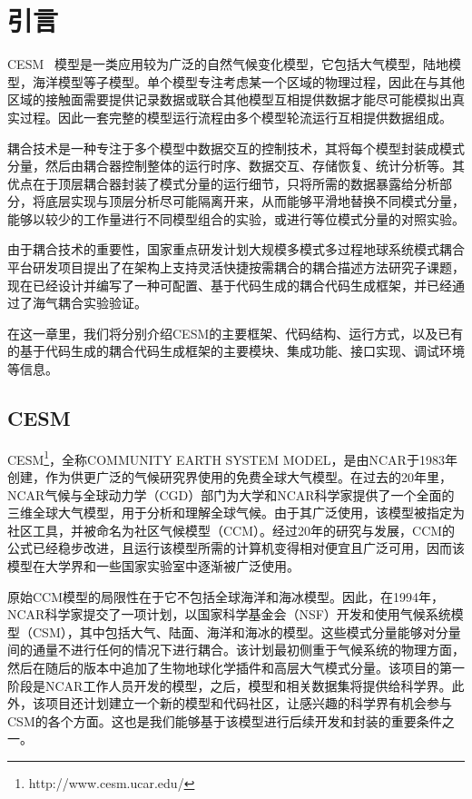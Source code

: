 \chapter{引言}
\label{cha:intro}

CESM ~\cite{CESMwebsite}模型是一类应用较为广泛的自然气候变化模型，它包括大气模型，陆地模型，海洋模型等子模型。单个模型专注考虑某一个区域的物理过程，因此在与其他区域的接触面需要提供记录数据或联合其他模型互相提供数据才能尽可能模拟出真实过程。因此一套完整的模型运行流程由多个模型轮流运行互相提供数据组成。

耦合技术是一种专注于多个模型中数据交互的控制技术，其将每个模型封装成模式分量，然后由耦合器控制整体的运行时序、数据交互、存储恢复、统计分析等。其优点在于顶层耦合器封装了模式分量的运行细节，只将所需的数据暴露给分析部分，将底层实现与顶层分析尽可能隔离开来，从而能够平滑地替换不同模式分量，能够以较少的工作量进行不同模型组合的实验，或进行等位模式分量的对照实验。

由于耦合技术的重要性，国家重点研发计划大规模多模式多过程地球系统模式耦合平台研发项目提出了在架构上支持灵活快捷按需耦合的耦合描述方法研究子课题，现在已经设计并编写了一种可配置、基于代码生成的耦合代码生成框架，并已经通过了海气耦合实验验证。

在这一章里，我们将分别介绍CESM的主要框架、代码结构、运行方式，以及已有的基于代码生成的耦合代码生成框架的主要模块、集成功能、接口实现、调试环境等信息。

\section{CESM}

CESM\texttrademark\footnote{http://www.cesm.ucar.edu/}，全称COMMUNITY EARTH SYSTEM MODEL，是由NCAR于1983年创建，作为供更广泛的气候研究界使用的免费全球大气模型。在过去的20年里，NCAR气候与全球动力学（CGD）部门为大学和NCAR科学家提供了一个全面的三维全球大气模型，用于分析和理解全球气候。由于其广泛使用，该模型被指定为社区工具，并被命名为社区气候模型（CCM）。经过20年的研究与发展，CCM的公式已经稳步改进，且运行该模型所需的计算机变得相对便宜且广泛可用，因而该模型在大学界和一些国家实验室中逐渐被广泛使用。

原始CCM模型的局限性在于它不包括全球海洋和海冰模型。因此，在1994年，NCAR科学家提交了一项计划，以国家科学基金会（NSF）开发和使用气候系统模型（CSM），其中包括大气、陆面、海洋和海冰的模型。这些模式分量能够对分量间的通量不进行任何的情况下进行耦合。该计划最初侧重于气候系统的物理方面，然后在随后的版本中追加了生物地球化学插件和高层大气模式分量。该项目的第一阶段是NCAR工作人员开发的模型，之后，模型和相关数据集将提供给科学界。此外，该项目还计划建立一个新的模型和代码社区，让感兴趣的科学界有机会参与CSM的各个方面。这也是我们能够基于该模型进行后续开发和封装的重要条件之一。

